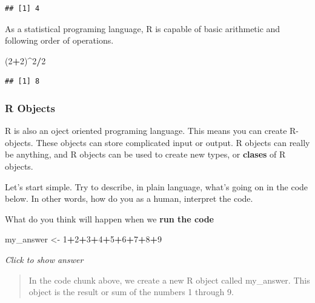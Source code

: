 \documentclass[
]{book}
\newenvironment{Shaded}{\begin{snugshade}}{\end{snugshade}}
\newcommand{\DecValTok}[1]{\textcolor[rgb]{0.00,0.00,0.81}{#1}}
\newcommand{\NormalTok}[1]{#1}
\newcommand{\OtherTok}[1]{\textcolor[rgb]{0.56,0.35,0.01}{#1}}
\newcommand{\SpecialCharTok}[1]{\textcolor[rgb]{0.81,0.36,0.00}{\textbf{#1}}}
\begin{document}
\begin{verbatim}
## [1] 4
\end{verbatim}

As a statistical programing language, R is capable of basic arithmetic and following order of operations.

\begin{Shaded}
\begin{Highlighting}[]
\NormalTok{(}\DecValTok{2}\SpecialCharTok{+}\DecValTok{2}\NormalTok{)}\SpecialCharTok{\^{}}\DecValTok{2}\SpecialCharTok{/}\DecValTok{2}
\end{Highlighting}
\end{Shaded}

\begin{verbatim}
## [1] 8
\end{verbatim}

\hypertarget{r-objects}{%
\subsubsection{R Objects}\label{r-objects}}

R is also an oject oriented programing language. This means you can create R-objects. These objects can store complicated input or output. R objects can really be anything, and R objects can be used to create new types, or \textbf{clases} of R objects.

Let's start simple. Try to describe, in plain language, what's going on in the code below. In other words, how do you as a human, interpret the code.

What do you think will happen when we \textbf{run the code}

\begin{Shaded}
\begin{Highlighting}[]
\NormalTok{my\_answer }\OtherTok{\textless{}{-}} \DecValTok{1}\SpecialCharTok{+}\DecValTok{2}\SpecialCharTok{+}\DecValTok{3}\SpecialCharTok{+}\DecValTok{4}\SpecialCharTok{+}\DecValTok{5}\SpecialCharTok{+}\DecValTok{6}\SpecialCharTok{+}\DecValTok{7}\SpecialCharTok{+}\DecValTok{8}\SpecialCharTok{+}\DecValTok{9}
\end{Highlighting}
\end{Shaded}

\emph{Click to show answer}

\begin{quote}
In the code chunk above, we create a new R object called my\_answer. This
object is the result or sum of the numbers 1 through 9.
\end{quote}
\end{document}
